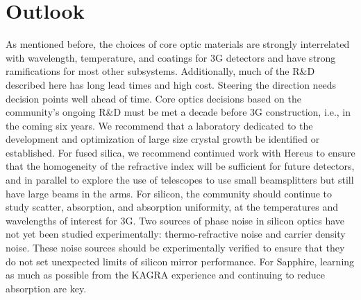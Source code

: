 \section{Outlook} 
As mentioned before, the choices of core optic materials are strongly interrelated with wavelength, temperature, and coatings for 3G detectors and have strong ramifications for most other subsystems. Additionally, much of the R\&D described here has long lead times and high cost. Steering the direction needs decision points well ahead of time. Core optics decisions based on the community's ongoing R\&D must be met a decade before 3G construction, i.e., in the coming six years. 
We recommend that a laboratory dedicated to the development and optimization of large size crystal growth be identified or established.
For fused silica, we recommend continued work with Hereus to ensure that the homogeneity of the refractive index will be sufficient for future detectors, and in parallel to explore the use of telescopes to use small beamsplitters but still have large beams in the arms. For silicon, the community should continue to study scatter, absorption, and absorption uniformity, at the temperatures and wavelengths of interest for 3G. Two sources of phase noise in silicon optics have not yet been studied experimentally: thermo-refractive noise and carrier density noise. These noise sources should be experimentally verified to ensure that they do not set unexpected limits of silicon mirror performance. 
For Sapphire, learning as much as possible from the KAGRA experience and continuing to reduce absorption are key. 



